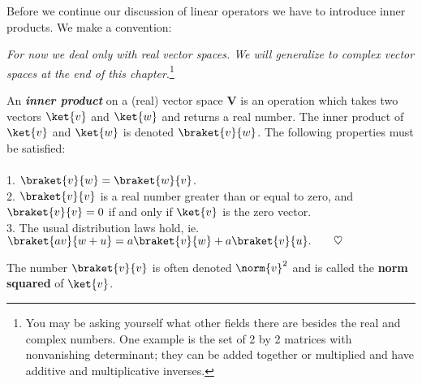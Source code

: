 Before we continue our discussion of linear operators we have to introduce inner products.  We make a convention:

\textit{For now we deal only with real vector spaces.  We will generalize to complex vector spaces at the end of this chapter}.\footnote{You may be asking yourself what other fields there are besides the real and complex numbers.  One example is the set of 2 by 2 matrices with nonvanishing determinant; they can be added together or multiplied and have additive and multiplicative inverses.}
\begin{definition}
An \emph{\textbf{inner product}} on a (real) vector space \textbf{V} is an operation which takes two vectors $\ket{v}$ and $\ket{w}$ and returns a real number. The inner product of $\ket{v}$ and $\ket{w}$ is denoted $\braket{v}{w}$.  The following properties must be satisfied:\\
\\
1. $\braket{v}{w} = \braket{w}{v}$.\\
2. $\braket{v}{v}$ is a real number greater than or equal to zero, and $\braket{v}{v} = 0$ if and only if $\ket{v}$ is the zero vector.\\
3. The usual distribution laws hold, ie. $\braket{av}{w + u} = a\braket{v}{w} + a\braket{v}{u}. \qquad \heartsuit$
\end{definition}
The number $\braket{v}{v}$ is often denoted $\norm{v}^2$ and is called the \textbf{norm squared} of $\ket{v}$.

